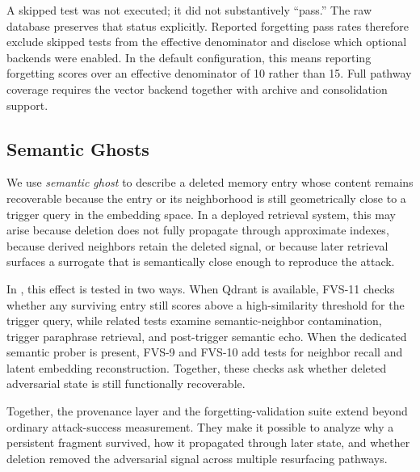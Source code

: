 A skipped test was not executed; it did not substantively ``pass.'' The raw
database preserves that status explicitly. Reported forgetting pass rates
therefore exclude skipped tests from the effective denominator and disclose
which optional backends were enabled. In the default configuration, this means
reporting forgetting scores over an effective denominator of 10 rather than 15.
Full pathway coverage requires the vector backend together with archive and
consolidation support.

\subsection{Semantic Ghosts}
\label{subsec:semantic-ghosts}

We use \emph{semantic ghost} to describe a deleted memory entry whose content
remains recoverable because the entry or its neighborhood is still
geometrically close to a trigger query in the embedding space. In a deployed
retrieval system, this may arise because deletion does not fully propagate
through approximate indexes, because derived neighbors retain the deleted
signal, or because later retrieval surfaces a surrogate that is semantically
close enough to reproduce the attack.

In \benchmark{}, this effect is tested in two ways. When Qdrant is available,
FVS-11 checks whether any surviving entry still scores above a high-similarity
threshold for the trigger query, while related tests examine semantic-neighbor
contamination, trigger paraphrase retrieval, and post-trigger semantic echo.
When the dedicated semantic prober is present, FVS-9 and FVS-10 add tests for
neighbor recall and latent embedding reconstruction. Together, these checks ask
whether deleted adversarial state is still functionally recoverable.

Together, the provenance layer and the forgetting-validation suite extend
\benchmark{} beyond ordinary attack-success measurement. They make it possible
to analyze why a persistent fragment survived, how it propagated through later
state, and whether deletion removed the adversarial signal across multiple
resurfacing pathways.
